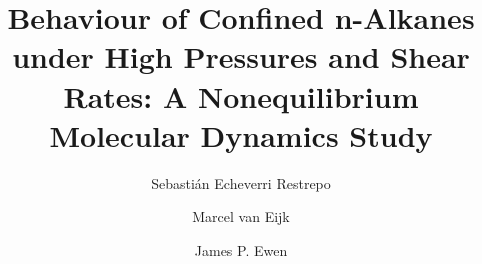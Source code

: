 \documentclass[5p]{elsarticle}
\begin{document}

\title{Behaviour of Confined n-Alkanes under High Pressures and Shear Rates: A Nonequilibrium Molecular Dynamics Study}


\author[SKF,KCL]{Sebasti\'{a}n Echeverri Restrepo}
\author[SKF]{Marcel van Eijk}
\author[IC]{James P. Ewen}
\address[SKF]{SKF Research \& Technology Development, Nieuwegein, The Netherlands}
\address[KCL]{Department of Physics, King's College London, Strand, London WC2R 2LS, UK}
\address[IC]{Department of Mechanical Engineering, Imperial College London, London SW7 2AZ, England, UK}

\end{document}
